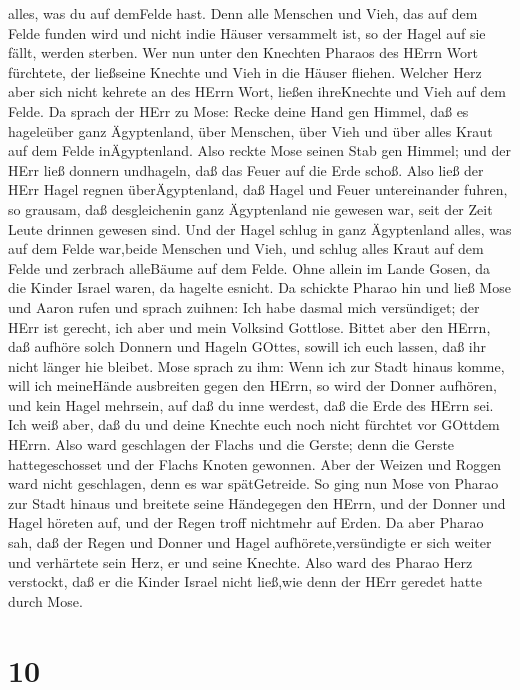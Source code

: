 alles, was du auf demFelde hast. Denn alle Menschen und Vieh, das auf
dem Felde funden wird und nicht indie Häuser versammelt ist, so der
Hagel auf sie fällt, werden sterben.  Wer nun unter den
Knechten Pharaos des HErrn Wort fürchtete, der ließseine Knechte und
Vieh in die Häuser fliehen.  Welcher Herz aber sich nicht
kehrete an des HErrn Wort, ließen ihreKnechte und Vieh auf dem Felde.
 Da sprach der HErr zu Mose: Recke deine Hand gen Himmel,
daß es hageleüber ganz Ägyptenland, über Menschen, über Vieh und über
alles Kraut auf dem Felde inÄgyptenland.  Also reckte Mose
seinen Stab gen Himmel; und der HErr ließ donnern undhageln, daß das
Feuer auf die Erde schoß. Also ließ der HErr Hagel regnen
überÄgyptenland,  daß Hagel und Feuer untereinander fuhren,
so grausam, daß desgleichenin ganz Ägyptenland nie gewesen war, seit der
Zeit Leute drinnen gewesen sind.  Und der Hagel schlug in
ganz Ägyptenland alles, was auf dem Felde war,beide Menschen und Vieh,
und schlug alles Kraut auf dem Felde und zerbrach alleBäume auf dem
Felde.  Ohne allein im Lande Gosen, da die Kinder Israel
waren, da hagelte esnicht.  Da schickte Pharao hin und ließ
Mose und Aaron rufen und sprach zuihnen: Ich habe dasmal mich
versündiget; der HErr ist gerecht, ich aber und mein Volksind Gottlose.
 Bittet aber den HErrn, daß aufhöre solch Donnern und
Hageln GOttes, sowill ich euch lassen, daß ihr nicht länger hie bleibet.
 Mose sprach zu ihm: Wenn ich zur Stadt hinaus komme, will
ich meineHände ausbreiten gegen den HErrn, so wird der Donner aufhören,
und kein Hagel mehrsein, auf daß du inne werdest, daß die Erde des HErrn
sei.  Ich weiß aber, daß du und deine Knechte euch noch
nicht fürchtet vor GOttdem HErrn.  Also ward geschlagen der
Flachs und die Gerste; denn die Gerste hattegeschosset und der Flachs
Knoten gewonnen.  Aber der Weizen und Roggen ward nicht
geschlagen, denn es war spätGetreide.  So ging nun Mose von
Pharao zur Stadt hinaus und breitete seine Händegegen den HErrn, und der
Donner und Hagel höreten auf, und der Regen troff nichtmehr auf Erden.
 Da aber Pharao sah, daß der Regen und Donner und Hagel
aufhörete,versündigte er sich weiter und verhärtete sein Herz, er und
seine Knechte.  Also ward des Pharao Herz verstockt, daß er
die Kinder Israel nicht ließ,wie denn der HErr geredet hatte durch Mose.

\hypertarget{section-9}{%
\section{10}\label{section-9}}

